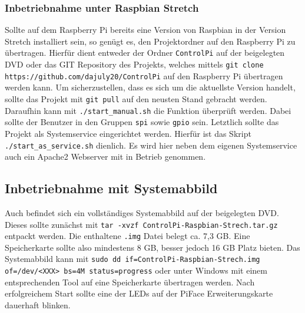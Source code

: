  \subsubsection{Inbetriebnahme unter Raspbian Stretch}
 Sollte auf dem Raspberry Pi bereits eine Version von Raspbian in der Version Stretch installiert sein, so genügt es, den Projektordner auf den Raspberry Pi zu übertragen. Hierfür dient entweder der Ordner \texttt{ControlPi} auf der beigelegten DVD oder das GIT Repository des Projekts, welches mittels \texttt{git clone https://github.com/dajuly20/ControlPi} auf den Raspberry Pi übertragen werden kann. Um sicherzustellen, dass es sich um die aktuellste Version handelt, sollte das Projekt mit \texttt{git pull} auf den neusten Stand gebracht werden. Daraufhin kann mit \texttt{./start\_manual.sh} die Funktion überprüft werden. Dabei sollte der Benutzer in den Gruppen \texttt{spi} sowie \texttt{gpio} sein. Letztlich sollte das Projekt als Systemservice eingerichtet werden. Hierfür ist das Skript \texttt{./start\_as\_service.sh} dienlich. Es wird hier neben dem eigenen Systemservice auch ein Apache2 Webserver mit in Betrieb genommen.
 
 \subsection{Inbetriebnahme mit Systemabbild}
 Auch befindet sich ein vollständiges Systemabbild\cite{URL:Image} auf der beigelegten DVD. Dieses sollte zunächst mit \texttt{tar -xvzf ControlPi-Raspbian-Strech.tar.gz} entpackt werden. Die enthaltene \texttt{.img} Datei belegt ca. 7,3 GB. Eine Speicherkarte sollte also mindestens 8 GB, besser jedoch 16 GB Platz bieten. Das Systemabbild kann mit \texttt{sudo dd if=ControlPi-Raspbian-Strech.img of=/dev/<XXX> bs=4M status=progress} oder unter Windows mit einem entsprechenden Tool\cite{URL:Win32DiskImager} auf eine Speicherkarte übertragen werden. Nach erfolgreichem Start sollte eine der LEDs auf der PiFace Erweiterungskarte dauerhaft blinken.  
 
